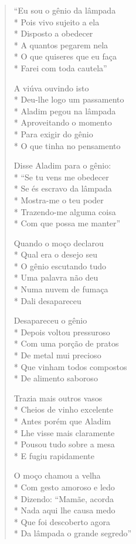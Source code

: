 \begin{verse}
``Eu sou o gênio da lâmpada\\*
Pois vivo sujeito a ela\\*
Disposto a obedecer\\*
A quantos pegarem nela\\*
O que quiseres que eu faça\\*
Farei com toda cautela''

A viúva ouvindo isto\\*
Deu-lhe logo um passamento\\*
Aladim pegou na lâmpada\\*
Aproveitando o momento\\*
Para exigir do gênio\\*
O que tinha no pensamento

Disse Aladim para o gênio:\\*
``Se tu vens me obedecer\\*
Se és escravo da lâmpada\\*
Mostra-me o teu poder\\*
Trazendo-me alguma coisa\\*
Com que possa me manter''

Quando o moço declarou\\*
Qual era o desejo seu\\*
O gênio escutando tudo\\*
Uma palavra não deu\\*
Numa nuvem de fumaça\\*
Dali desapareceu

Desapareceu o gênio\\*
Depois voltou pressuroso\\*
Com uma porção de pratos\\*
De metal mui precioso\\*
Que vinham todos compostos\\*
De alimento saboroso

Trazia mais outros vasos\\*
Cheios de vinho excelente\\*
Antes porém que Aladim\\*
Lhe visse mais claramente\\*
Pousou tudo sobre a mesa\\*
E fugiu rapidamente

O moço chamou a velha\\*
Com gesto amoroso e ledo\\*
Dizendo: ``Mamãe, acorda\\*
Nada aqui lhe causa medo\\*
Que foi descoberto agora\\*
Da lâmpada o grande segredo''


\end{verse}
